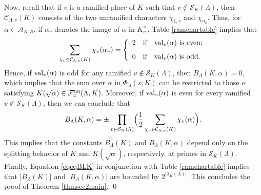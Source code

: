 \documentclass[10pt]{article}
\theoremstyle{plain}
\theoremstyle{definition}
\theoremstyle{remark}
\def\un{{\rm un}}
\def\cC{{\mathcal C}}
\def\cF{{\mathcal F}}
\def\cS{{\mathcal S}}
\newcommand{\cA}{{\mathcal A}}
\begin{document}
Now, recall that if $v$ is a ramified place of $K$ such that
$v\not\in\cS_K(\Lambda)$, then $\cC_{\Lambda,v}(K)$ consists of the
two unramified characters $\chi_{1,v}$ and $\chi_{n_v}$. Thus, for $\alpha\in\cA_{K,\cS}$, if $\alpha_v$ denotes the image of $\alpha$ in $K_v^\times$,
Table \ref{ramchartable} implies that \begin{equation}\label{removingoddalpha}
\sum_{\chi_v\in\cC_{\Lambda,v}(K)}{\chi_v(\alpha_v)} = 
\left\{
\begin{array}{ccl}
\displaystyle 2
&\mbox{if}& {\rm val}_v(\alpha) \mbox{ is even};\\[.1in]
0&\mbox{if}& {\rm val}_v(\alpha) \mbox{ is odd}.
\end{array}
\right.
\end{equation}
Hence, if ${\rm val}_v(\alpha)$ is odd for any
ramified $v\not\in\cS_K(\Lambda)$, then
$B_\Lambda(K,\alpha)=0$, which implies that the sum over $\alpha$ in $\Phi_{\Lambda}(s;K)$ can be restricted to those $\alpha$ satisfying $K(\sqrt{\alpha}) \in \cF^{\un}_4(\Lambda,K)$. Moreover, if ${\rm val}_v(\alpha)$ is even for
every ramified $v\not\in\cS_K(\Lambda)$, then
we can conclude that
\begin{equation}\label{eqeqBLK}
  B_{\Lambda}(K,\alpha)= \pm \prod_{v\in\cS_K(\Lambda)}
  \Bigl(\frac12\sum_{\chi_v\in\cC_{\Lambda,v}(K)}\chi_v(\alpha)
  \Bigr).
\end{equation}
This implies that the constants $B_{\Lambda}(K)$ and $B_{\Lambda}(K,\alpha)$ depend only on the splitting behavior of $K$ and $K(\sqrt{\alpha})$, respectively, at primes in $\cS_{K}(\Lambda)$. Finally, Equation \eqref{eqeqBLK} in conjunction with Table \ref{ramchartable} implies that $|B_{\Lambda}(K)|$ and $|B_{\Lambda}(K,\alpha)|$ are bounded by $2^{|\cS_K(\Lambda)|}$. This concludes the proof of Theorem
\ref{thmsec2main}. \qed


\medskip
\end{document}
